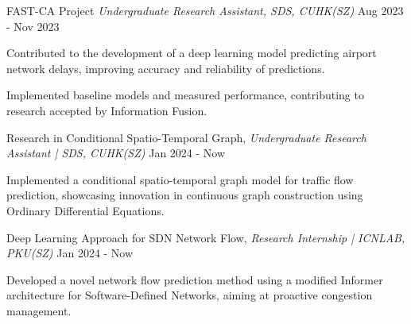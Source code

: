 \cventrynew
{FAST-CA Project \textnormal{\textit{Undergraduate Research Assistant, SDS, CUHK(SZ)}}} %
{Aug 2023 - Nov 2023} %
{
  \begin{cvitems} %
    \item {Contributed to the development of a deep learning model predicting airport network delays, improving accuracy and reliability of predictions.}
    \item {Implemented baseline models and measured performance, contributing to research accepted by Information Fusion.}
  \end{cvitems}
}

\cventrynew
{Research in Conditional Spatio-Temporal Graph, \textnormal{\textit{Undergraduate Research Assistant | SDS, CUHK(SZ)}}} %
{Jan 2024 - Now} %
{
  \begin{cvitems} %
    \item {Implemented a conditional spatio-temporal graph model for traffic flow prediction, showcasing innovation in continuous graph construction using Ordinary Differential Equations.}
  \end{cvitems}
}

\cventrynew
{Deep Learning Approach for SDN Network Flow, \textnormal{\textit{Research Internship | ICNLAB, PKU(SZ)}}} %
{Jan 2024 - Now} %
{
  \begin{cvitems} %
    \item {Developed a novel network flow prediction method using a modified Informer architecture for Software-Defined Networks, aiming at proactive congestion management.}
  \end{cvitems}
}